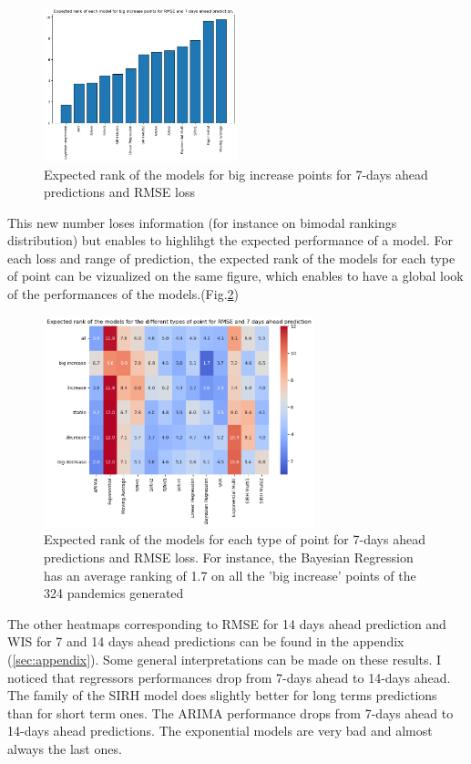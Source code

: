 \begin{figure}[h!]
    \centering
    \includegraphics[width=0.5\textwidth]{figures/expected_ranks_big_increase_RMSE_7.png}
    \caption{Expected rank of the models for big increase points for 7-days ahead predictions and RMSE loss}
    \label{fig:expected_rank}
\end{figure}

This new number loses information (for instance on bimodal rankings distribution) but enables to highlihgt the expected performance of a model. 
For each loss and range of prediction, the expected rank of the models for each type of point can be vizualized on the same figure, which enables to have a global look of the performances of the models.(Fig.\ref{fig:heatmap_RMSE_7}) 
\begin{figure}[h!]
    \centering
    \includegraphics[width=0.7\textwidth]{figures/heatmap_RMSE_7.png}
    \caption{Expected rank of the models for each type of point for 7-days ahead predictions and RMSE loss. For instance, the Bayesian Regression has an average ranking of 1.7 on all the 'big increase' points of the 324 pandemics generated }
    \label{fig:heatmap_RMSE_7}
\end{figure}


The other heatmaps corresponding to RMSE for 14 days ahead prediction and WIS for 7 and 14 days ahead predictions can be found in the appendix (\ref{sec:appendix}).
Some general interpretations can be made on these results. 
I noticed that regressors performances drop from 7-days ahead to 14-days ahead. 
The family of the SIRH model does slightly better for long terms predictions than for short term ones. 
The ARIMA performance drops from 7-days ahead to 14-days ahead predictions. 
The exponential models are very bad and almost always the last ones. 

